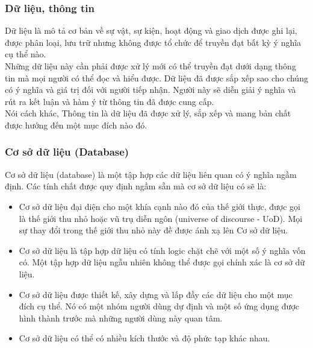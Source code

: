 \subsubsection{Dữ liệu, thông tin}
\hspace*{0.5cm} Dữ liệu là mô tả cơ bản về sự vật, sự kiện, hoạt động và giao dịch được ghi lại, được phân loại, lưu trữ nhưng không được tổ chức để truyền đạt bất kỳ ý nghĩa cụ thể nào.\\
\hspace*{0.5cm} Những dữ liệu này cần phải được xử lý mới có thể truyền đạt dưới dạng thông tin mà mọi người có thể đọc và hiểu được. Dữ liệu đã được sắp xếp sao cho chúng có ý nghĩa và giá trị đối với người tiếp nhận. Người này sẽ diễn giải ý nghĩa và rút ra kết luận và hàm ý từ thông tin đã được cung cấp. \\
\hspace*{0.5cm} Nói cách khác, Thông tin là dữ liệu đã được xử lý, sắp xếp và mang bản chất được hướng đến một mục đích nào đó.
\subsubsection{Cơ sở dữ liệu (Database)}
\hspace*{0.5cm} Cơ sở dữ liệu (database) là một tập hợp các dữ liệu liên quan có ý nghĩa ngầm định. Các tính chất được quy định ngầm sẵn mà cơ sở dữ liệu có sẽ là: 
\begin{itemize}
	\item Cơ sở dữ liệu đại diện cho một khía cạnh nào đó của thế giới thực, được gọi là thế giới thu nhỏ hoặc vũ trụ diễn ngôn (universe of discourse - UoD). Mọi sự thay đổi trong thế giới thu nhỏ này đề được ánh xạ lên Cơ sở dữ liệu.
	\item Cơ sở dữ liệu là tập hợp dữ liệu có tính logic chặt chẽ với một số ý nghĩa vốn có. Một tập hợp dữ liệu ngẫu nhiên không thể được gọi chính xác là cơ sở dữ liệu.
	\item Cơ sở dữ liệu được thiết kế, xây dựng và lấp đầy các dữ liệu cho một mục đích cụ thể. Nó có một nhóm người dùng dự định và một số ứng dụng được hình thành trước mà những người dùng này quan tâm.
	\item Cơ sở dữ liệu có thể có nhiều kích thước và độ phức tạp khác nhau.
\end{itemize}
